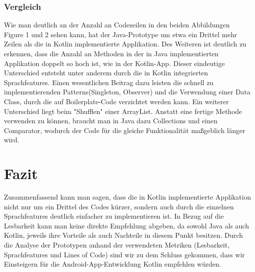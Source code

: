 \documentclass{sigchi-ext}
\begin{document}
\subsubsection{Vergleich}
Wie man deutlich an der Anzahl an Codezeilen in den beiden Abbildungen Figure 1 und 2 sehen kann, hat der Java-Prototype um etwa ein Drittel mehr Zeilen als die in Kotlin implementierte Applikation. Des Weiteren ist deutlich zu erkennen, dass die Anzahl an Methoden in der in Java implementierten Applikation doppelt so hoch ist, wie in der Kotlin-App. Dieser eindeutige Unterschied entsteht unter anderem durch die in Kotlin integrierten Sprachfeatures. Einen wesentlichen Beitrag dazu leisten die schnell zu implementierenden Patterns(Singleton, Observer) und die Verwendung einer Data Class, durch die auf Boilerplate-Code verzichtet werden kann.
Ein weiterer Unterschied liegt beim "Shufflen" einer ArrayList. Anstatt eine fertige Methode verwenden zu können, braucht man in Java dazu Collections und einen Comparator, wodurch der Code für die gleiche Funktionalität maßgeblich länger wird.

\section{Fazit}
Zusammenfassend kann man sagen, dass die in Kotlin implementierte Applikation nicht nur um ein Drittel des Codes kürzer, sondern auch durch die einzelnen Sprachfeatures deutlich einfacher zu implementieren ist. In Bezug auf die Lesbarkeit kann man keine direkte Empfehlung abgeben, da sowohl Java als auch Kotlin, jeweils ihre Vorteile als auch Nachteile in diesem Punkt besitzen. Durch die Analyse der Prototypen anhand der verwendeten Metriken (Lesbarkeit, Sprachfeatures und Lines of Code) sind wir zu dem Schluss gekommen, dass wir Einsteigern für die Android-App-Entwicklung Kotlin empfehlen würden.





\end{document}

